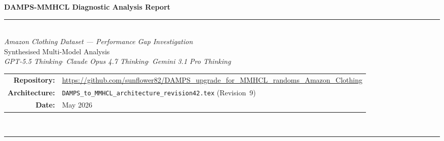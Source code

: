 \documentclass[12pt,a4paper]{article}
\begin{document}
\thispagestyle{empty}
\begin{center}
  \vspace*{1.2cm}
  {\LARGE\bfseries DAMPS-MMHCL Diagnostic Analysis Report}\\[0.9em]
  \rule{0.60\textwidth}{0.4pt}\\[0.9em]
  {\large\itshape Amazon Clothing Dataset --- Performance Gap Investigation}\\[1.8em]
  {\normalsize
    Synthesised Multi-Model Analysis\\[0.5em]
    \textit{GPT-5.5 Thinking\enspace$\cdot$\enspace
            Claude Opus 4.7 Thinking\enspace$\cdot$\enspace
            Gemini 3.1 Pro Thinking}
  }\\[2.5em]
  \begin{tabular}{@{}r>{\small}p{10cm}@{}}
    \textbf{Repository:}   &
      \url{https://github.com/sunflower82/DAMPS_upgrade_for_MMHCL_randoms_Amazon_Clothing}\\[0.6em]
    \textbf{Architecture:} &
      \texttt{DAMPS\_to\_MMHCL\_architecture\_revision42.tex} (Revision~9)\\[0.6em]
    \textbf{Date:}         & May 2026
  \end{tabular}\\[2.5em]
  \rule{0.60\textwidth}{0.4pt}
\end{center}

\newpage
\begin{abstract}
\noindent
This report investigates a systematic 10.7\% Recall@20 deficit observed
when integrating DAMPS into the MMHCL framework on the Amazon Clothing
dataset ($0.0786$ vs.\ $0.0881$ paper baseline, averaged over 10 random
seeds).  NDCG@20 and Precision@20 degrade by only 2.9\% and 2.6\%
respectively, indicating a \emph{candidate coverage failure} rather than
a ranking failure.  Three frontier reasoning models independently converge
on this diagnosis.  Six ranked root-cause hypotheses are presented---from
an evaluation protocol mismatch (highest impact, zero compute cost to
verify) to a learnable temperature $\tau$ stuck at a local minimum, AVRF
spectral over-filtering, and a hypergraph NNZ explosion---together with a
prioritised six-configuration ablation grid for efficient diagnosis.
\end{abstract}

\tableofcontents
\newpage
\end{document}

